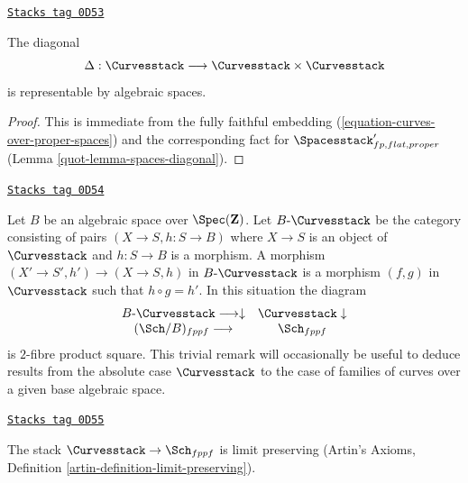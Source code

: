 \begin{lemma}
\label{quot-lemma-curves-diagonal}
\href{https://stacks.math.columbia.edu/tag/0D53}{\texttt{Stacks tag 0D53}}

The diagonal
$$
\Delta : \Curvesstack \longrightarrow \Curvesstack \times \Curvesstack
$$
is representable by algebraic spaces.
\end{lemma}

\begin{proof}

This is immediate from the fully faithful embedding
(\ref{equation-curves-over-proper-spaces}) and
the corresponding fact for $\Spacesstack'_{fp, flat, proper}$
(Lemma \ref{quot-lemma-spaces-diagonal}).
\end{proof}

\begin{remark}
\label{quot-remark-curves-base-change}
\href{https://stacks.math.columbia.edu/tag/0D54}{\texttt{Stacks tag 0D54}}

Let $B$ be an algebraic space over $\Spec(\mathbf{Z})$.
Let $B\text{-}\Curvesstack$ be the category consisting
of pairs $(X \to S, h : S \to B)$
where $X \to S$ is an object of
$\Curvesstack$ and $h : S \to B$ is a morphism.
A morphism $(X' \to S', h') \to (X \to S, h)$
in $B\text{-}\Curvesstack$ is a morphism $(f, g)$
in $\Curvesstack$ such that $h \circ g = h'$.
In this situation the diagram
$$
\begin{array}{cc}B\text{-}\Curvesstack \longrightarrow\downarrow & \Curvesstack \downarrow \\ (\Sch/B)_{fppf} \longrightarrow & \Sch_{fppf}\end{array}
$$
is $2$-fibre product square. This trivial remark
will occasionally be useful to deduce results from
the absolute case $\Curvesstack$ to the case
of families of curves over a given base algebraic space.
\end{remark}

\begin{lemma}
\label{quot-lemma-curves-limits}
\href{https://stacks.math.columbia.edu/tag/0D55}{\texttt{Stacks tag 0D55}}

The stack $\Curvesstack \to \Sch_{fppf}$ is limit preserving
(Artin's Axioms, Definition \ref{artin-definition-limit-preserving}).
\end{lemma}

